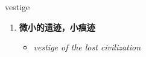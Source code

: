 
\begin{frame}
{\huge vestige}
\begin{center}
\begin{enumerate}\Large
  \item \textbf{微小的遗迹，小痕迹}
  \begin{itemize}
    \item \em{\Large{vestige of the lost civilization}}
  \end{itemize}
\end{enumerate}
\end{center}
\end{frame}
